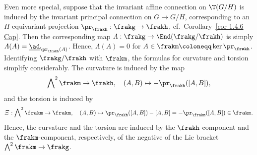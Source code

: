 Even more special, suppose that the invariant affine connection on $\T(G\slash H)$ is induced by the invariant principal connection on $G\to G\slash H$, corresponding to an $H$-equivariant projection $\pr_\frakh:\frakg\to\frakh$, cf.\ Corollary~\ref{cor 1.4.6 Cap}. Then the corresponding map $\varLambda:\frakg\to \End(\frakg\slash\frakh)$ is simply $\varLambda(A)=\underline{\ad}_{\pr_\frakh(A)}$. Hence, $\varLambda(A)=0$ for $A\in \frakm\coloneqq \ker\pr_\frakh$. Identifying $\frakg\slash\frakh$ with $\frakm$, the formulas for curvature and torsion simplify considerably. The curvature is induced by the map 
\[\bigwedge\nolimits^2\frakm\to \frakh,\quad (A,B)\mapsto -\pr_\frakh([A,B]),\]
and the torsion is induced by  
\[\varXi:\bigwedge\nolimits^2\frakm\to \frakm,\quad (A,B)\mapsto \pr_\frakh([A,B])-[A,B]=-\pr_\frakm([A,B])\in\frakm.\]
Hence, the curvature and the torsion are induced by the $\frakh$-component and the $\frakm$-component, respectively, of the negative of the Lie bracket $\bigwedge\nolimits^2\frakm\to \frakg$.


